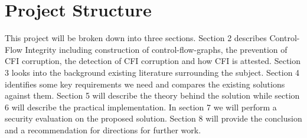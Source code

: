 \section{Project Structure}

This project will be broken down into three sections. Section 2 describes Control-Flow Integrity including construction of control-flow-graphs, the prevention of CFI corruption, the detection of CFI corruption and how CFI is attested. Section 3 looks into the background existing literature surrounding the subject. Section 4 identifies some key requirements we need and compares the existing solutions against them. Section 5 will describe the theory behind the solution while section 6 will describe the practical implementation. In section 7 we will perform a security evaluation on the proposed solution. Section 8 will provide the conclusion and a recommendation for directions for further work.